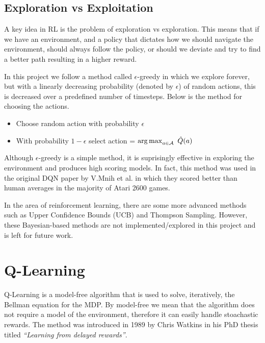 \subsection{Exploration vs Exploitation}
\label{dsgn:sec:rl:expt-v-explor}
A key idea in RL is the problem of exploration vs exploration. This means that if we have an environment, and a policy that dictates how we should navigate the environment, should always follow the policy, or should we deviate and try to find a better path resulting in a higher reward.

In this project we follow a method called $\epsilon$-greedy in which we explore forever, but with a linearly decreasing probability (denoted by $\epsilon$) of random actions, this is decreased over a predefined number of timesteps. Below is the method for choosing the actions.

\begin{center}
	\begin{itemize}
		\item Choose random action with probability $\epsilon$
		\item With probability $1 - \epsilon$ select action = $\operatorname*{arg\,max}_{a \in \mathcal{A}}~\hat{Q}(a)$
	\end{itemize}
\end{center}

Although $\epsilon$-greedy is a simple method, it is suprisingly effective in exploring the environment and produces high scoring models. In fact, this method was used in the original DQN paper by V.Mnih et al. in which they scored better than human averages in the majority of Atari 2600 games.

In the area of reinforcement learning, there are some more advanced methods such as Upper Confidence Bounds (UCB) and Thompson Sampling. However, these Bayesian-based methods are not implemented/explored in this project and is left for future work.

\newpage

\section{Q-Learning}
\label{dsgn:sec:qlearning}
Q-Learning is a model-free algorithm that is used to solve, iteratively, the Bellman equation for the MDP. By model-free we mean that the algorithm does not require a model of the environment, therefore it can easily handle stoachastic rewards. The method was introduced in 1989 by Chris Watkins in his PhD thesis titled \textit{``Learning from delayed rewards''}.

